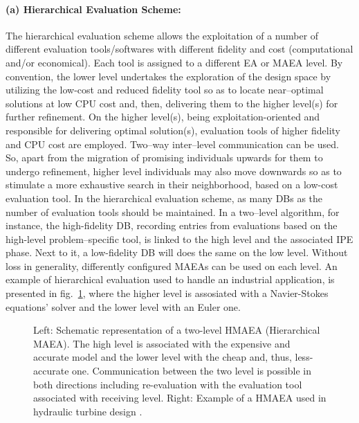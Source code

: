 \paragraph{(a) Hierarchical Evaluation Scheme:}  
The hierarchical evaluation scheme allows the exploitation of a number of different evaluation tools/softwares with different fidelity and cost (computational and/or economical). Each tool is assigned to a different EA or MAEA level. By convention, the lower level undertakes the exploration of the design space by utilizing the low-cost and reduced fidelity tool so as to locate near–optimal solutions at low CPU cost and, then, delivering them to the higher level(s) for further refinement. On the higher level(s), being exploitation-oriented and responsible for delivering optimal solution(s), evaluation tools of higher fidelity and CPU cost are employed. Two–way inter–level communication can be used. So, apart from the migration of promising individuals upwards for them to undergo refinement, higher level individuals may also move downwards so as to stimulate a more exhaustive search in their neighborhood, based on a low-cost evaluation tool. In the hierarchical evaluation scheme, as many DBs as the number of evaluation tools should be maintained. In a two–level algorithm, for instance, the high-fidelity DB, recording entries from evaluations based on the high-level problem–specific tool, is linked to the high level and the associated IPE phase. Next to it, a low-fidelity DB will does the same on the low level. Without loss in generality, differently configured MAEAs can be used on each level. An example of hierarchical evaluation used to handle an industrial application, is presented in fig.\ \ref{HMAEA}, where the higher level is assosiated with a Navier-Stokes equations' solver and the lower level with an Euler one.


\begin{figure}[h!]
\begin{minipage}[b]{1.0\linewidth}
 \centering
\end{minipage}
\caption{Left: Schematic representation of a two-level HMAEA (Hierarchical MAEA). The high level is associated with the expensive and accurate model and the lower level with the cheap and, thus, less-accurate one. Communication between the two level is possible in both directions including re-evaluation with the evaluation tool associated with receiving level. Right: Example of a HMAEA used in hydraulic turbine design \cite{LTT_3_094}.}
\label{HMAEA}
\end{figure} 

